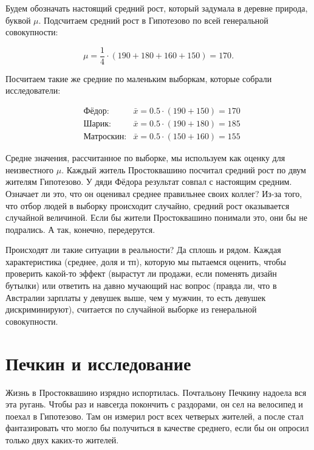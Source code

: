 \documentclass[12pt, a4paper, oneside]{article}
\begin{document}
\begin{sol}
Будем обозначать настоящий средний рост, который задумала в деревне природа, буквой $\mu$. Подсчитаем средний рост в Гипотезово  по всей генеральной совокупности: 

\[
\mu = \frac{1}{4} \cdot (190 + 180 + 160 + 150) = 170.
\]

Посчитаем такие же средние по маленьким выборкам, которые собрали исследователи: 

\begin{equation*} 
\begin{aligned} 
& \text{Фёдор:}  & \bar{x} = 0.5 \cdot (190 + 150) = 170 \\
& \text{Шарик:}  & \bar{x} = 0.5 \cdot (190 + 180) = 185 \\
& \text{Матроскин:} & \bar{x} = 0.5 \cdot (150 + 160) = 155 
\end{aligned}
\end{equation*}

Средне значения, рассчитанное по выборке, мы используем как оценку для неизвестного $\mu$. Каждый житель Простоквашино посчитал средний рост по двум жителям Гипотезово. У дяди Фёдора результат совпал с настоящим средним. Означает ли это, что он оценивал среднее правильнее своих коллег?    Из-за того, что отбор людей в выборку происходит случайно, средний рост оказывается случайной величиной. Если бы жители Простоквашино понимали это, они бы не подрались. А так, конечно, передерутся. 

Происходят ли такие ситуации в реальности? Да сплошь и рядом. Каждая характеристика (среднее, доля и тп), которую мы пытаемся оценить, чтобы проверить какой-то эффект (вырастут ли продажи, если поменять дизайн бутылки) или ответить на давно мучающий нас вопрос (правда ли, что в Австралии зарплаты у девушек выше, чем у мужчин, то есть девушек дискриминируют), считается по случайной выборке из генеральной совокупности.  
\end{sol}

\section{Печкин и исследование}

Жизнь в Простоквашино изрядно испортилась. Почтальону Печкину надоела вся эта ругань. Чтобы раз и навсегда покончить с раздорами, он сел на велосипед и поехал в Гипотезово. Там он измерил рост всех четверых жителей, а после стал фантазировать что могло бы получиться в качестве среднего, если бы он опросил только двух каких-то жителей. 
\end{document}
